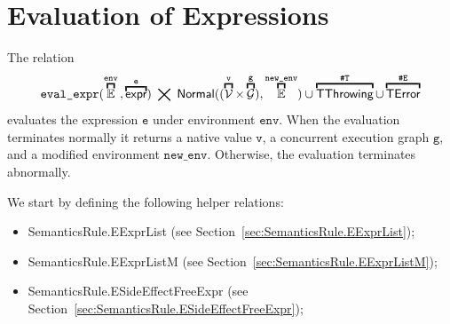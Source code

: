 \documentclass{book}
\newcommand\overname[2]{\overbracket{#1}^{#2}}
\newcommand\XGraphs[0]{\mathcal{G}}
\newcommand\vals[0]{\mathcal{V}}
\newcommand\aslrel[0]{\bigtimes}
\newcommand\aslsep[0]{\mathbf{,}}
\newcommand\ThrowingConfig[0]{\texttt{\#T}}
\newcommand\ErrorConfig[0]{\texttt{\#E}}
\newcommand\TError[0]{\textsf{TError}}
\newcommand\TThrowing[0]{\textsf{TThrowing}}
\newcommand\evalexpr[1]{\texttt{eval\_expr}(#1)}
\newcommand\Normal[0]{\textsf{Normal}}
\newcommand\newenv[0]{\texttt{new\_env}}
\newcommand\env[0]{\texttt{env}}
\newcommand\ve[0]{\texttt{e}}
\newcommand\vg[0]{\texttt{g}}
\newcommand\vv[0]{\texttt{v}}
\begin{document}
\chapter{Evaluation of Expressions \label{chap:eval_expr}}

The relation
\[
  \evalexpr{\overname{\envs}{\env} \aslsep \overname{\expr}{\ve}} \;\aslrel\;
            \Normal((\overname{\vals}{\vv} \times \overname{\XGraphs}{\vg}) \aslsep \overname{\envs}{\newenv}) \cup
            \overname{\TThrowing}{\ThrowingConfig} \cup \overname{\TError}{\ErrorConfig}
\]
evaluates the expression $\ve$ under environment $\env$.
When the evaluation terminates normally it returns a native value $\vv$, a concurrent execution graph $\vg$,
and a modified environment $\newenv$.
Otherwise, the evaluation terminates abnormally.

We start by defining the following helper relations:
\begin{itemize}
  \item SemanticsRule.EExprList (see Section~\ref{sec:SemanticsRule.EExprList});
  \item SemanticsRule.EExprListM (see Section~\ref{sec:SemanticsRule.EExprListM});
  \item SemanticsRule.ESideEffectFreeExpr (see Section~\ref{sec:SemanticsRule.ESideEffectFreeExpr});
\end{itemize}
\end{document}
